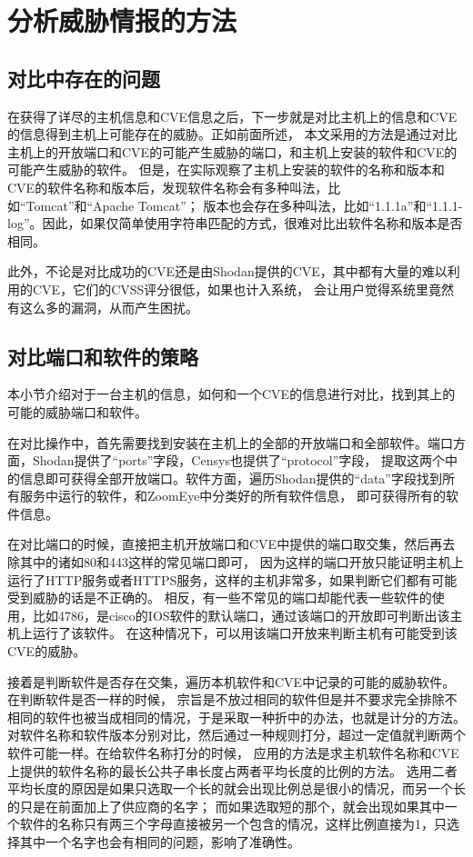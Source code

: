 \section{分析威胁情报的方法}
\label{chap3:analysis-strategy}

\subsection{对比中存在的问题}
\label{sec:comparation-problems}

在获得了详尽的主机信息和CVE信息之后，下一步就是对比主机上的信息和CVE的信息得到主机上可能存在的威胁。正如前面所述，
本文采用的方法是通过对比主机上的开放端口和CVE的可能产生威胁的端口，和主机上安装的软件和CVE的可能产生威胁的软件。
但是，在实际观察了主机上安装的软件的名称和版本和CVE的软件名称和版本后，发现软件名称会有多种叫法，比如“Tomcat”和“Apache Tomcat”；
版本也会存在多种叫法，比如“1.1.1a”和“1.1.1-log”。因此，如果仅简单使用字符串匹配的方式，很难对比出软件名称和版本是否相同。

此外，不论是对比成功的CVE还是由Shodan提供的CVE，其中都有大量的难以利用的CVE，它们的CVSS评分很低，如果也计入系统，
会让用户觉得系统里竟然有这么多的漏洞，从而产生困扰。

\subsection{对比端口和软件的策略}
\label{sec:comparation-strategy}

本小节介绍对于一台主机的信息，如何和一个CVE的信息进行对比，找到其上的可能的威胁端口和软件。

在对比操作中，首先需要找到安装在主机上的全部的开放端口和全部软件。端口方面，Shodan提供了“ports”字段，Censys也提供了“protocol”字段，
提取这两个中的信息即可获得全部开放端口。软件方面，遍历Shodan提供的“data”字段找到所有服务中运行的软件，和ZoomEye中分类好的所有软件信息，
即可获得所有的软件信息。

在对比端口的时候，直接把主机开放端口和CVE中提供的端口取交集，然后再去除其中的诸如80和443这样的常见端口即可，
因为这样的端口开放只能证明主机上运行了HTTP服务或者HTTPS服务，这样的主机非常多，如果判断它们都有可能受到威胁的话是不正确的。
相反，有一些不常见的端口却能代表一些软件的使用，比如4786，是cisco的IOS软件的默认端口，通过该端口的开放即可判断出该主机上运行了该软件。
在这种情况下，可以用该端口开放来判断主机有可能受到该CVE的威胁。

接着是判断软件是否存在交集，遍历本机软件和CVE中记录的可能的威胁软件。在判断软件是否一样的时候，
宗旨是不放过相同的软件但是并不要求完全排除不相同的软件也被当成相同的情况，于是采取一种折中的办法，也就是计分的方法。
对软件名称和软件版本分别对比，然后通过一种规则打分，超过一定值就判断两个软件可能一样。在给软件名称打分的时候，
应用的方法是求主机软件名称和CVE上提供的软件名称的最长公共子串长度占两者平均长度的比例的方法。
选用二者平均长度的原因是如果只选取一个长的就会出现比例总是很小的情况，而另一个长的只是在前面加上了供应商的名字；
而如果选取短的那个，就会出现如果其中一个软件的名称只有两三个字母直接被另一个包含的情况，这样比例直接为1，只选择其中一个名字也会有相同的问题，影响了准确性。

